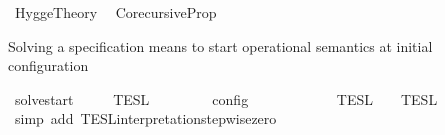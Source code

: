 %
\begin{isabellebody}%
%
%
\isadelimdocument
%
\endisadelimdocument
%
\isatagdocument
%
\isamarkuptrue%
%
\endisatagdocument
{\isafolddocument}%
%
\isadelimdocument
%
\endisadelimdocument
%
\isadelimtheory
%
\endisadelimtheory
%
\isatagtheory
{}\isamarkupfalse%
\ Hygge{\isacharunderscore}Theory\isanewline
{}\isanewline
\ \ Corecursive{\isacharunderscore}Prop\isanewline
\isanewline
{}%
\endisatagtheory
{\isafoldtheory}%
%
\isadelimtheory
%
\endisadelimtheory
%
\isadelimdocument
%
\endisadelimdocument
%
\isatagdocument
%
\isamarkuptrue%
%
\endisatagdocument
{\isafolddocument}%
%
\isadelimdocument
%
\endisadelimdocument
%
\begin{isamarkuptext}%
Solving a specification \isa{{\isasymPsi}} means to start operational semantics at initial 
  configuration %
\end{isamarkuptext}\isamarkuptrue%
\isamarkupfalse%
\ solve{\isacharunderscore}start{\isacharcolon}\isanewline
\ \ \ {\isacartoucheopen}{\isasymlbrakk}{\isasymlbrakk}\ {\isasymPsi}\ {\isasymrbrakk}{\isasymrbrakk}\isactrlsub T\isactrlsub E\isactrlsub S\isactrlsub L\ {\isacharequal}\ {\isasymlbrakk}\ {\isacharbrackleft}{\isacharbrackright}{\isacharcomma}\ {}\ {\isasymturnstile}\ {\isasymPsi}\ {\isasymtriangleright}\ {\isacharbrackleft}{\isacharbrackright}\ {\isasymrbrakk}\isactrlsub c\isactrlsub o\isactrlsub n\isactrlsub f\isactrlsub i\isactrlsub g{\isacartoucheclose}\isanewline
%
\isadelimproof
\ \ %
\endisadelimproof
%
\isatagproof
{}\isamarkupfalse%
\ {\isacharminus}\isanewline
\ \ \ \ \isamarkupfalse%
\ {\isacartoucheopen}{\isasymlbrakk}{\isasymlbrakk}\ {\isasymPsi}\ {\isasymrbrakk}{\isasymrbrakk}\isactrlsub T\isactrlsub E\isactrlsub S\isactrlsub L\ {\isacharequal}\ {\isasymlbrakk}{\isasymlbrakk}\ {\isasymPsi}\ {\isasymrbrakk}{\isasymrbrakk}\isactrlsub T\isactrlsub E\isactrlsub S\isactrlsub L\isactrlbsup {\isasymge}\ {}\isactrlesup {\isacartoucheclose}\isanewline
\ \ \ \ \isamarkupfalse%
\ {\isacharparenleft}simp\ add{\isacharcolon}\ TESL{\isacharunderscore}interpretation{\isacharunderscore}stepwise{\isacharunderscore}zero{\isacharprime}{\isacharparenright}\isanewline

\end{isabellebody}
